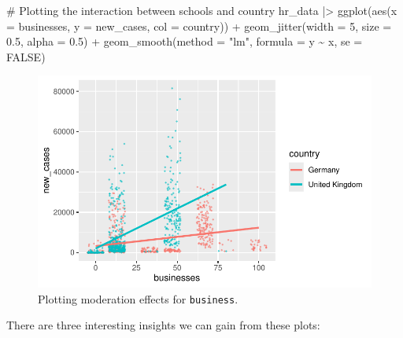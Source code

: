 \documentclass[
  letterpaper,
  DIV=11,
  numbers=noendperiod]{scrreprt}
\newenvironment{Shaded}{\begin{snugshade}}{\end{snugshade}}
\newcommand{\AttributeTok}[1]{\textcolor[rgb]{0.40,0.45,0.13}{#1}}
\newcommand{\CommentTok}[1]{\textcolor[rgb]{0.37,0.37,0.37}{#1}}
\newcommand{\ConstantTok}[1]{\textcolor[rgb]{0.56,0.35,0.01}{#1}}
\newcommand{\DecValTok}[1]{\textcolor[rgb]{0.68,0.00,0.00}{#1}}
\newcommand{\FloatTok}[1]{\textcolor[rgb]{0.68,0.00,0.00}{#1}}
\newcommand{\FunctionTok}[1]{\textcolor[rgb]{0.28,0.35,0.67}{#1}}
\newcommand{\NormalTok}[1]{\textcolor[rgb]{0.00,0.23,0.31}{#1}}
\newcommand{\SpecialCharTok}[1]{\textcolor[rgb]{0.37,0.37,0.37}{#1}}
\newcommand{\StringTok}[1]{\textcolor[rgb]{0.13,0.47,0.30}{#1}}
\begin{document}
\begin{Shaded}
\begin{Highlighting}[]
\CommentTok{\# Plotting the interaction between schools and country}
\NormalTok{hr\_data }\SpecialCharTok{|\textgreater{}}
  \FunctionTok{ggplot}\NormalTok{(}\FunctionTok{aes}\NormalTok{(}\AttributeTok{x =}\NormalTok{ businesses,}
             \AttributeTok{y =}\NormalTok{ new\_cases,}
             \AttributeTok{col =}\NormalTok{ country)) }\SpecialCharTok{+}
  \FunctionTok{geom\_jitter}\NormalTok{(}\AttributeTok{width =} \DecValTok{5}\NormalTok{,}
              \AttributeTok{size =} \FloatTok{0.5}\NormalTok{,}
              \AttributeTok{alpha =} \FloatTok{0.5}\NormalTok{) }\SpecialCharTok{+}
  \FunctionTok{geom\_smooth}\NormalTok{(}\AttributeTok{method =} \StringTok{"lm"}\NormalTok{,}
              \AttributeTok{formula =}\NormalTok{ y }\SpecialCharTok{\textasciitilde{}}\NormalTok{ x,}
              \AttributeTok{se =} \ConstantTok{FALSE}\NormalTok{)}
\end{Highlighting}
\end{Shaded}

\begin{figure}[H]

{\centering \includegraphics{13_regressions_files/figure-latex/plotting-moderation-effects-businesses-1.pdf}

}

\caption{Plotting moderation effects for \texttt{business}.}

\end{figure}%

There are three interesting insights we can gain from these plots:
\end{document}
